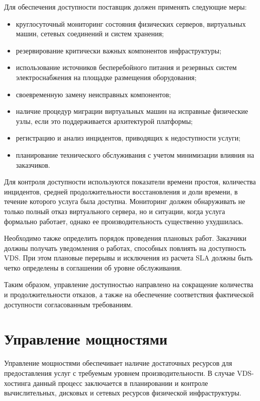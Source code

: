\documentclass[14pt,a4paper]{extarticle}
\begin{document}
Для обеспечения доступности поставщик должен применять следующие меры:
\begin{itemize}
    \item круглосуточный мониторинг состояния физических серверов, виртуальных
    машин, сетевых соединений и систем хранения;
    \item резервирование критически важных компонентов инфраструктуры;
    \item использование источников бесперебойного питания и резервных систем
    электроснабжения на площадке размещения оборудования;
    \item своевременную замену неисправных компонентов;
    \item наличие процедур миграции виртуальных машин на исправные физические узлы,
    если это поддерживается архитектурой платформы;
    \item регистрацию и анализ инцидентов, приводящих к недоступности услуги;
    \item планирование технического обслуживания с учетом минимизации влияния на
    заказчиков.
\end{itemize}

Для контроля доступности используются показатели времени простоя, количества
инцидентов, средней продолжительности восстановления и доли времени, в течение
которого услуга была доступна. Мониторинг должен обнаруживать не только полный
отказ виртуального сервера, но и ситуации, когда услуга формально работает, однако
ее производительность существенно ухудшилась.

Необходимо также определить порядок проведения плановых работ. Заказчики должны
получать уведомления о работах, способных повлиять на доступность VDS. При этом
плановые перерывы и исключения из расчета SLA должны быть четко определены в
соглашении об уровне обслуживания.

Таким образом, управление доступностью направлено на сокращение количества и
продолжительности отказов, а также на обеспечение соответствия фактической
доступности согласованным требованиям.

\section{Управление мощностями}

Управление мощностями обеспечивает наличие достаточных ресурсов для предоставления
услуг с требуемым уровнем производительности. В случае VDS-хостинга данный процесс
заключается в планировании и контроле вычислительных, дисковых и сетевых ресурсов
физической инфраструктуры.
\end{document}

